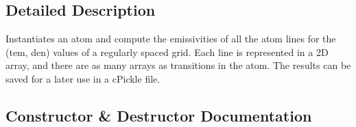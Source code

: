 \subsection{Detailed Description}
\begin{DoxyVerb}Instantiates an atom and compute the emissivities of all the atom lines for the (tem, den) 
values of a regularly spaced grid.
Each line is represented in a 2D array, and there are as many arrays as transitions in the atom.
The results can be saved for a later use in a cPickle file.\end{DoxyVerb}
 

\subsection{Constructor \& Destructor Documentation}
\hypertarget{classpyneb_1_1core_1_1emis_grid_1_1_emis_grid_aae5b18f3f3cbd6bfae7baee194f78fd7}{}
